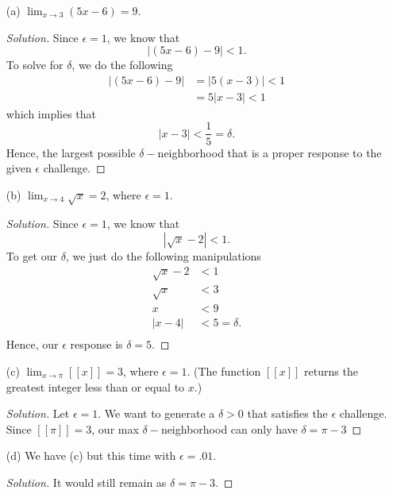 \begin{enumerate}
    \item[(a)] \( \lim_{ x \to 3 } (5x - 6 ) = 9  \).
        \begin{proof}[Solution]
        Since \( \epsilon = 1  \), we know that 
        \[ | (5x-6) - 9  | < 1.\]
        To solve for \( \delta \), we do the following
        \begin{align*}
            | (5x - 6) - 9  | &= | 5 (x - 3 ) | < 1    \\
                              &= 5 | x - 3  | < 1 
        \end{align*}
        which implies that 
        \[  | x - 3  | < \frac{ 1 }{ 5 } = \delta. \]
        Hence, the largest possible \( \delta- \)neighborhood that is a proper response to the given \( \epsilon   \) challenge. 
        \end{proof}
    \item[(b)] \( \lim_{ x \to 4 } \sqrt{ x } = 2  \), where \( \epsilon = 1  \).
        \begin{proof}[Solution]
        Since \( \epsilon = 1  \), we know that 
        \[  | \sqrt{ x }  - 2  | < 1. \]
        To get our \( \delta \), we just do the following manipulations
        \begin{align*}
            \sqrt{ x } - 2   &< 1  \\
            \sqrt{ x } &< 3 \\
            x &< 9 \\
            | x - 4  | &< 5 = \delta. \\
        \end{align*}
        Hence, our \( \epsilon  \) response is \( \delta =  5  \).
        \end{proof}
    \item[(c)] \( \lim_{ x  \to \pi } [[x]] = 3 \), where \( \epsilon = 1  \). (The function \( [[x]] \) returns the greatest integer less than or equal to \( x  \).)
        \begin{proof}[Solution]
            Let \( \epsilon = 1  \). We want to generate a \( \delta > 0  \) that satisfies the \( \epsilon  \) challenge. Since \( [[\pi]] = 3  \), our max \( \delta- \)neighborhood can only have \( \delta = \pi - 3  \)
        \end{proof}
    \item[(d)] We have (c) but this time with \( \epsilon = .01 \).  
        \begin{proof}[Solution]
        It would still remain as \( \delta = \pi - 3  \).
        \end{proof}
\end{enumerate}

